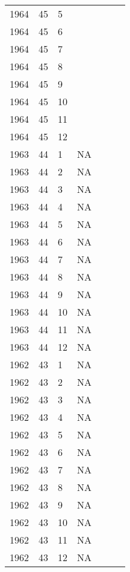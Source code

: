\begin{longtable}{ |l|l|l|l|p{2.7cm}|l|p{2cm}| }
 1964 & 45 &     5 &         &                &  & \\
 1964 & 45 &     6 &         &                &  & \\
 1964 & 45 &     7 &         &                &  & \\
 1964 & 45 &     8 &         &                &  & \\
 1964 & 45 &     9 &         &                &  & \\
 1964 & 45 &    10 &         &                &   & \\
 1964 & 45 &    11 &         &                &  & \\
 1964 & 45 &    12 &         &                &  & \\
 1963 & 44 &     1 &      NA &                &  & \\
 1963 & 44 &     2 &      NA &                &  & \\
 1963 & 44 &     3 &      NA &                &  & \\
 1963 & 44 &     4 &      NA &                &  & \\
 1963 & 44 &     5 &      NA &                &  & \\
 1963 & 44 &     6 &      NA &                &  & \\
 1963 & 44 &     7 &      NA &                &  & \\
 1963 & 44 &     8 &      NA &                &  & \\
 1963 & 44 &     9 &      NA &                &  & \\
 1963 & 44 &    10 &      NA &                &  & \\
 1963 & 44 &    11 &      NA &                &  & \\
 1963 & 44 &    12 &      NA &                &  & \\
 1962 & 43 &     1 &      NA &                &  & \\
 1962 & 43 &     2 &      NA &                &  & \\
 1962 & 43 &     3 &      NA &                &  & \\
 1962 & 43 &     4 &      NA &                &  & \\
 1962 & 43 &     5 &      NA &                &  & \\
 1962 & 43 &     6 &      NA &                &  & \\
 1962 & 43 &     7 &      NA &                &   & \\
 1962 & 43 &     8 &      NA &                &  & \\
 1962 & 43 &     9 &      NA &                &  & \\
 1962 & 43 &    10 &      NA &                &  & \\
 1962 & 43 &    11 &      NA &                &  & \\
 1962 & 43 &    12 &      NA &                &  & \\
\end{longtable}
